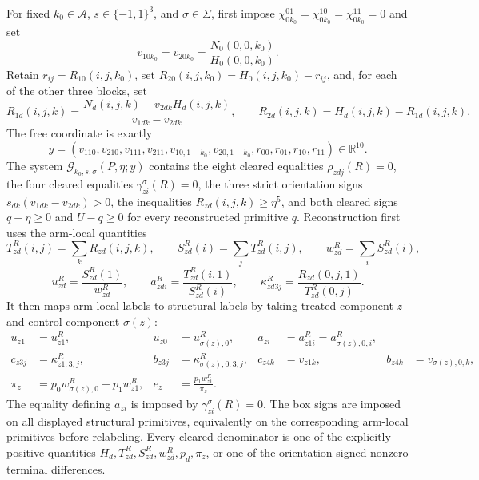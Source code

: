 For fixed \(k_0\in\mathcal A\), \(s\in\{-1,1\}^{3}\), and \(\sigma\in\Sigma\), first impose \(\chi_{0k_0}^{01}=\chi_{0k_0}^{10}=\chi_{0k_0}^{11}=0\) and set
\[
 v_{10k_0}=v_{20k_0}=\frac{N_0(0,0,k_0)}{H_0(0,0,k_0)}.
\]
Retain \(r_{ij}=R_{10}(i,j,k_0)\), set \(R_{20}(i,j,k_0)=H_0(i,j,k_0)-r_{ij}\), and, for each of the other three blocks, set
\[
 R_{1d}(i,j,k)=\frac{N_d(i,j,k)-v_{2dk}H_d(i,j,k)}{v_{1dk}-v_{2dk}},
 \qquad R_{2d}(i,j,k)=H_d(i,j,k)-R_{1d}(i,j,k).
\]
The free coordinate is exactly
\[
 y=(v_{110},v_{210},v_{111},v_{211},v_{10,1-k_0},v_{20,1-k_0},r_{00},r_{01},r_{10},r_{11})\in\mathbb R^{10}.
\]
The system \(\mathscr G_{k_0,s,\sigma}(P,\eta;y)\) contains the eight cleared equalities \(\rho_{zdj}(R)=0\), the four cleared equalities \(\gamma_{zi}^{\sigma}(R)=0\), the three strict orientation signs \(s_{dk}(v_{1dk}-v_{2dk})>0\), the inequalities \(R_{zd}(i,j,k)\geq\eta^5\), and both cleared signs \(q-\eta\geq0\) and \(U-q\geq0\) for every reconstructed primitive \(q\).  Reconstruction first uses the arm-local quantities
\[
 T_{zd}^{R}(i,j)=\sum_kR_{zd}(i,j,k),\qquad
 S_{zd}^{R}(i)=\sum_jT_{zd}^{R}(i,j),\qquad
 w_{zd}^{R}=\sum_iS_{zd}^{R}(i),
\]
\[
 u_{zd}^{R}=\frac{S_{zd}^{R}(1)}{w_{zd}^{R}},\qquad
 a_{zdi}^{R}=\frac{T_{zd}^{R}(i,1)}{S_{zd}^{R}(i)},\qquad
 \kappa_{zd3j}^{R}=\frac{R_{zd}(0,j,1)}{T_{zd}^{R}(0,j)}.
\]
It then maps arm-local labels to structural labels by taking treated component \(z\) and control component \(\sigma(z)\):
\[
 \begin{aligned}
 u_{z1}&=u_{z1}^{R},& u_{z0}&=u_{\sigma(z),0}^{R},&
 a_{zi}&=a_{z1i}^{R}=a_{\sigma(z),0,i}^{R},\\
 c_{z3j}&=\kappa_{z1,3,j}^{R},& b_{z3j}&=\kappa_{\sigma(z),0,3,j}^{R},&
 c_{z4k}&=v_{z1k},& b_{z4k}&=v_{\sigma(z),0,k},\\
 \pi_z&=p_0w_{\sigma(z),0}^{R}+p_1w_{z1}^{R},&
 e_z&=\frac{p_1w_{z1}^{R}}{\pi_z}.&&
 \end{aligned}
\]
The equality defining \(a_{zi}\) is imposed by \(\gamma_{zi}^{\sigma}(R)=0\).  The box signs are imposed on all displayed structural primitives, equivalently on the corresponding arm-local primitives before relabeling.  Every cleared denominator is one of the explicitly positive quantities \(H_d,T_{zd}^{R},S_{zd}^{R},w_{zd}^{R},p_d,\pi_z\), or one of the orientation-signed nonzero terminal differences.
